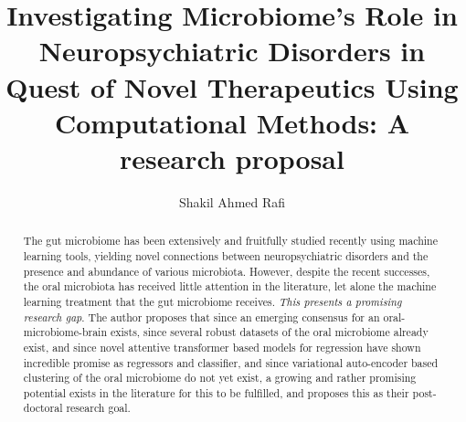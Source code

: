 \documentclass{article}
\title{Investigating Microbiome's Role in Neuropsychiatric Disorders in Quest of Novel Therapeutics Using Computational Methods: A research proposal}
\author{Shakil Ahmed Rafi}
\begin{document}
\maketitle
\begin{abstract}
	The gut microbiome has been extensively and fruitfully studied recently using machine learning tools, yielding novel connections between neuropsychiatric disorders and the presence and abundance of various microbiota. However, despite the recent successes, the oral microbiota has received little attention in the literature, let alone the machine learning treatment that the gut microbiome receives. \textit{This presents a promising research gap}. The author proposes that since an emerging consensus for an oral-microbiome-brain exists, since several robust datasets of the oral microbiome already exist, and since novel attentive transformer based models for regression have shown incredible promise as regressors and classifier, and since variational auto-encoder based clustering of the oral microbiome do not yet exist, a growing and rather promising potential exists in the literature for this to be fulfilled, and proposes this as their post-doctoral research goal.
\end{abstract}
\noindent
\end{document}
